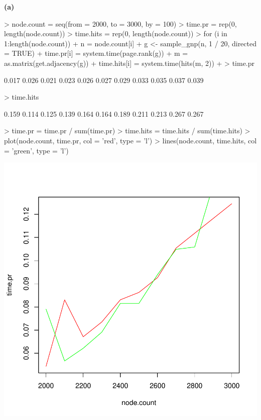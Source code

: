 \documentclass[a4paper]{article}
\renewcommand{\part}[1] {\vspace{.10in} {\bf (#1)}}
\begin{document}
\part{a}
\begin{Schunk}
\begin{Sinput}
> node.count = seq(from = 2000, to = 3000, by = 100)
> time.pr = rep(0, length(node.count))
> time.hits = rep(0, length(node.count))
> for (i in 1:length(node.count)){
+     n = node.count[i]
+     g <- sample_gnp(n, 1 / 20, directed = TRUE)
+     time.pr[i] = system.time(page.rank(g))
+     m = as.matrix(get.adjacency(g))
+     time.hits[i] = system.time(hits(m, 2))
+ }
> time.pr
\end{Sinput}
\begin{Soutput}
 [1] 0.017 0.026 0.021 0.023 0.026 0.027 0.029 0.033 0.035 0.037 0.039
\end{Soutput}
\begin{Sinput}
> time.hits
\end{Sinput}
\begin{Soutput}
 [1] 0.159 0.114 0.125 0.139 0.164 0.164 0.189 0.211 0.213 0.267 0.267
\end{Soutput}
\begin{Sinput}
> time.pr = time.pr / sum(time.pr)
> time.hits = time.hits / sum(time.hits)
> plot(node.count, time.pr, col = 'red', type = 'l')
> lines(node.count, time.hits, col = 'green', type = 'l')
\end{Sinput}
\end{Schunk}
\includegraphics{graph-2a}
\end{document}
